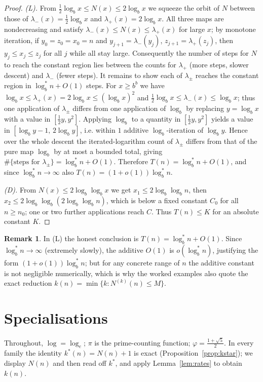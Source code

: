 \documentclass[12pt]{article}
\theoremstyle{definition}
\newtheorem{remark}{Remark}
\begin{document}
\begin{proof}
\smallskip
\emph{(L).} From $\tfrac12\log_b x\le N(x)\le2\log_b x$ we squeeze the orbit of $N$
between those of $\lambda_-(x)=\tfrac12\log_b x$ and $\lambda_+(x)=2\log_b x$. All
three maps are nondecreasing and satisfy $\lambda_-(x)\le N(x)\le\lambda_+(x)$ for
large $x$; by monotone iteration, if $y_0=z_0=x_0=n$ and $y_{j+1}=\lambda_-(y_j)$,
$z_{j+1}=\lambda_+(z_j)$, then $y_j\le x_j\le z_j$ for all $j$ while all stay large.
Consequently the number of steps for $N$ to reach the constant region lies between the
counts for $\lambda_+$ (more steps, slower descent) and $\lambda_-$ (fewer steps).
It remains to show each of $\lambda_\pm$ reaches the constant region in
$\log^*_b n+O(1)$ steps. For $x\ge b^{b}$ we have
$\log_b x\le\lambda_+(x)=2\log_b x\le(\log_b x)^2$ and
$\tfrac12\log_b x\le\lambda_-(x)\le\log_b x$; thus one application of $\lambda_\pm$
differs from one application of $\log_b$ by replacing $y=\log_b x$ with a value in
$[\tfrac12 y,y^2]$. Applying $\log_b$ to a quantity in $[\tfrac12 y,y^2]$ yields a
value in $[\log_b y-1,\,2\log_b y]$, i.e. within $1$ additive $\log_b$-iteration of
$\log_b y$. Hence over the whole descent the iterated-logarithm count of $\lambda_\pm$
differs from that of the pure map $\log_b$ by at most a bounded total, giving
$\#\{\text{steps for }\lambda_\pm\}=\log^*_b n+O(1)$. Therefore
$T(n)=\log^*_b n+O(1)$, and since $\log^*_b n\to\infty$ also
$T(n)=(1+o(1))\log^*_b n$.

\smallskip
\emph{(D).} From $N(x)\le2\log_b\log_b x$ we get $x_1\le2\log_b\log_b n$, then
$x_2\le2\log_b\log_b(2\log_b\log_b n)$, which is below a fixed constant $C_0$ for all
$n\ge n_0$; one or two further applications reach $C$. Thus $T(n)\le K$ for an
absolute constant $K$.
\end{proof}

\begin{remark}
In (L) the honest conclusion is $T(n)=\log^*_b n+O(1)$. Since $\log^*_b n\to\infty$
(extremely slowly), the additive $O(1)$ is $o(\log^*_b n)$, justifying the form
$(1+o(1))\log^*_b n$; but for any concrete range of $n$ the additive constant is not
negligible numerically, which is why the worked examples also quote the exact
reduction $k(n)=\min\{k:N^{(k)}(n)\le M\}$.
\end{remark}

\section{Specialisations}

Throughout, $\log=\log_e$; $\pi$ is the prime-counting function;
$\varphi=\tfrac{1+\sqrt5}2$. In every family the identity $k^*(n)=N(n)+1$ is exact
(Proposition~\ref{prop:kstar}); we display $N(n)$ and then read off $k^*$, and apply
Lemma~\ref{lem:rates} to obtain $k(n)$.
\end{document}
